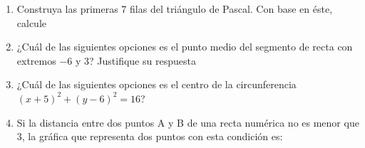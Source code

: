 \documentclass[fleqn]{article}
\begin{document}
\begin{enumerate}
\begin{enumerate}
 \end{enumerate}
 \item Construya las primeras 7 filas del triángulo de Pascal. Con base en éste, calcule \noanswer
 \begin{enumerate}
 \end{enumerate}
 \item ¿Cuál de las siguientes opciones es el punto medio del segmento de recta con extremos $-6$ y 3? Justifique su respuesta
 \begin{enumerate}
 \end{enumerate}
 \item ¿Cuál de las siguientes opciones es el centro de la circunferencia $(x+5)^{2}+(y-6)^{2}=16$?
 \begin{enumerate}
 \end{enumerate}
 \item Si la distancia entre dos puntos A y B de una recta numérica no es menor que 3, la gráfica que representa dos puntos con esta condición es:


\end{enumerate}
\end{document}
